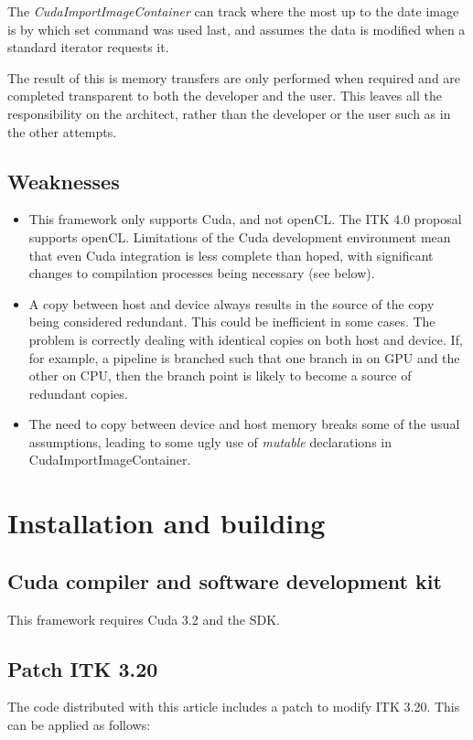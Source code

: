 \documentclass{InsightArticle}
\begin{document}
The {\em CudaImportImageContainer} can track where the most up to the
date image is by which set command was used last, and assumes the data
is modified when a standard iterator requests it.

The result of this is memory transfers are only performed when
required and are completed transparent to both the developer and the
user. This leaves all the responsibility on the architect, rather than
the developer or the user such as in the other attempts.

\subsection{Weaknesses}
\begin{itemize}
\item This framework only supports Cuda, and not openCL. The ITK 4.0
proposal supports openCL. Limitations of the Cuda development
environment mean that even Cuda integration is less complete than
hoped, with significant changes to compilation processes being
necessary (see below).
\item A copy between host and device always results in the source of
the copy being considered redundant. This could be inefficient in some
cases. The problem is correctly dealing with identical copies on both
host and device. If, for example, a pipeline is branched such that one
branch in on GPU and the other on CPU, then the branch point is likely
to become a source of redundant copies.
\item The need to copy between device and host memory breaks some of
the usual assumptions, leading to some ugly use of {\em mutable}
declarations in CudaImportImageContainer.
\end{itemize}

\section{Installation and building}
\subsection{Cuda compiler and software development kit}
This framework requires Cuda 3.2 and the SDK.
\subsection{Patch ITK 3.20}
The code distributed with this article includes a patch to modify ITK 3.20. This can be applied as follows:
\end{document}
